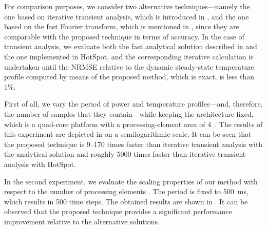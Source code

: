 For comparison purposes, we consider two alternative techniques---namely the one
based on iterative transient analysis, which is introduced in
, and the one based on the fast Fourier transform,
which is mentioned in , since they are comparable
with the proposed technique in terms of accuracy. In the case of transient
analysis, we evaluate both the fast analytical solution described in
 and the one implemented in HotSpot, and the
corresponding iterative calculation is undertaken until the \ac{NRMSE} relative
to the dynamic steady-state temperature profile computed by means of the
proposed method, which is exact, is less than 1\%.

First of all, we vary the period \period of power and temperature
profiles---and, therefore, the number of samples \ns that they contain---while
keeping the architecture fixed, which is a quad-core platform with a
processing-element area of 4~. The results of this experiment are
depicted in  on a semilogarithmic scale.
It can be seen that the proposed technique is 9--170 times faster than iterative
transient analysis with the analytical solution and roughly 5000 times faster
than iterative transient analysis with HotSpot.

In the second experiment, we evaluate the scaling properties of our method with
respect to the number of processing elements \np. The period is fixed to 500~ms,
which results in 500 time steps. The obtained results are shown in
. It can be observed that the proposed
technique provides a significant performance improvement relative to the
alternative solutions.
